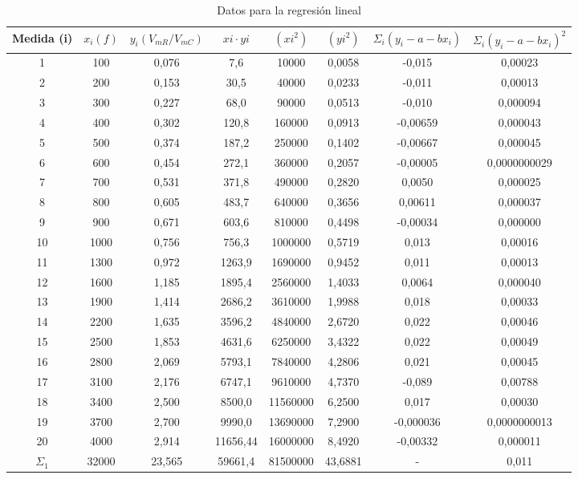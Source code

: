 \documentclass[10pt,a4paper]{article}
\begin{document}
\begin{table} %
\begin{center}
\begin{tabular}{| c | c | c | c | c | c | c | c |}
\hline

Medida (i) & $ x_i (f) $ & $ y_i (V_{mR} / V_{mC}) $ & $xi \cdot yi$ & $(xi ^ 2)$ & $(yi ^ 2)$ & $ \Sigma_i (y_i -a - bx_i) $ & $ \Sigma_i (y_i -a - bx_i)^2 $
  \\ \hline
1 & 100 & 0,076 & 7,6 & 10000 & 0,0058 & -0,015 & 0,00023
  \\ 
2 & 200 & 0,153 & 30,5 & 40000 & 0,0233 & -0,011 & 0,00013
  \\ 
3 & 300 & 0,227 & 68,0 & 90000 & 0,0513 & -0,010 & 0,000094
  \\ 
4 & 400 & 0,302 & 120,8 & 160000 & 0,0913 & -0,00659 & 0,000043
  \\ 
5 & 500 & 0,374 & 187,2 & 250000 & 0,1402 & -0,00667 & 0,000045
  \\ 
6 & 600 & 0,454 & 272,1 & 360000 & 0,2057 & -0,00005 & 0,0000000029
  \\ 
7 & 700 & 0,531 & 371,8 & 490000 & 0,2820 & 0,0050 & 0,000025
  \\ 
8 & 800 & 0,605 & 483,7 & 640000 & 0,3656 & 0,00611 & 0,000037
  \\ 
9 & 900 & 0,671 & 603,6 & 810000 & 0,4498 & -0,00034 & 0,000000
  \\ 
10 & 1000 & 0,756 & 756,3 & 1000000 & 0,5719 & 0,013 & 0,00016
  \\ 
11 & 1300 & 0,972 & 1263,9 & 1690000 & 0,9452 & 0,011 & 0,00013
  \\ 
12 & 1600 & 1,185 & 1895,4 & 2560000 & 1,4033 & 0,0064 & 0,000040
  \\ 
13 & 1900 & 1,414 & 2686,2 & 3610000 & 1,9988 & 0,018 & 0,00033
  \\ 
14 & 2200 & 1,635 & 3596,2 & 4840000 & 2,6720 & 0,022 & 0,00046
  \\ 
15 & 2500 & 1,853 & 4631,6 & 6250000 & 3,4322 & 0,022 & 0,00049
  \\ 
16 & 2800 & 2,069 & 5793,1 & 7840000 & 4,2806 & 0,021 & 0,00045
  \\ 
17 & 3100 & 2,176 & 6747,1 & 9610000 & 4,7370 & -0,089 & 0,00788
  \\ 
18 & 3400 & 2,500 & 8500,0 & 11560000 & 6,2500 & 0,017 & 0,00030
  \\ 
19 & 3700 & 2,700 & 9990,0 & 13690000 & 7,2900 & -0,000036 & 0,0000000013
  \\ 
20 & 4000 & 2,914 & 11656,44 & 16000000 & 8,4920 & -0,00332 & 0,000011
  \\ \hline
$\Sigma_1$  & 32000 & 23,565 & 59661,4 & 81500000 & 43,6881 & - & 0,011
  \\  \hline
\end{tabular}
\label{Desfases}
\caption{Datos para la regresión lineal}
\end{center}

\end{table}
\end{document}

